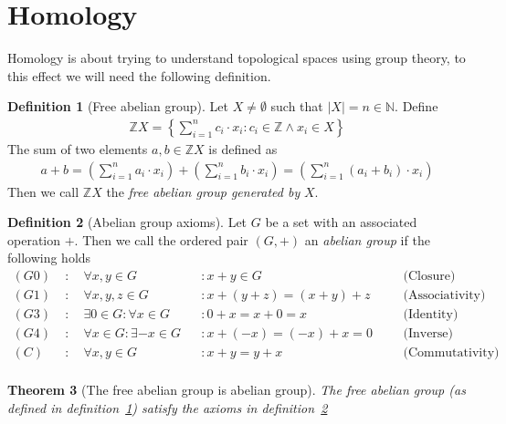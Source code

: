 \documentclass{article}
\theoremstyle{plain}
\newtheorem{theorem}{Theorem}
\theoremstyle{definition}
\newtheorem{definition}[theorem]{Definition}
\newcommand{\N}{\mathbb{N}}
\newcommand{\Z}{\mathbb{Z}}
\begin{document}
\section{Homology}
Homology is about trying to understand topological spaces using group theory, to
this effect we will need the following definition.
\begin{definition}[Free abelian group]\label{Free abelian group}
Let $X\neq \emptyset$ such that $\left|X\right|=n\in \N$. Define
\begin{equation}
\begin{aligned}
	\Z X = \left\{\sum_{i=1}^n c_i\cdot x_i:c_i \in \Z \land x_i \in X\right\}
\end{aligned}
\end{equation}
The sum of two elements $a,b\in \Z X$ is defined as
\begin{equation}
\begin{aligned}
	a+b = \left(\sum_{i=1}^n a_i\cdot x_i\right)+
	      \left(\sum_{i=1}^n b_i\cdot x_i\right)
		= \left(\sum_{i=1}^n (a_i+b_i)\cdot x_i\right)
\end{aligned}
\end{equation}
Then we call $\Z X$ the \textit{free abelian group generated by} $X$.
\end{definition}
\begin{definition}[Abelian group axioms]\label{Abelian group}
Let $G$ be a set with an associated operation $+$. Then we call the ordered pair
$(G,+)$ an \textit{abelian group} if the following holds
	\begin{equation*}
	\begin{aligned}
		(G0)\; &:\quad \forall x,y\in G &&: x+y\in G 
		&&&\text{(Closure)}\\
		(G1)\; &:\quad \forall x,y,z\in G &&: x+(y+z)=(x+y)+z
		&&&\text{(Associativity)}\\
		(G3)\; &:\quad \exists 0\in G:\forall x\in G &&: 0+x=x+0=x
		&&&\text{(Identity)}\\
		(G4)\; &:\quad \forall x\in G:\exists -x\in G &&: x+(-x)=(-x)+x=0
		&&&\text{(Inverse)}\\
		(C)\; &:\quad \forall x,y\in G&&: x+y=y+x
		&&&\text{(Commutativity)}\\
	\end{aligned}
	\end{equation*}
\end{definition}
\begin{theorem}[The free abelian group is abelian group]
	The free abelian group (as defined in definition~\ref{Free abelian group})
	satisfy the axioms in definition~\ref{Abelian group}
\end{theorem}
\end{document}
